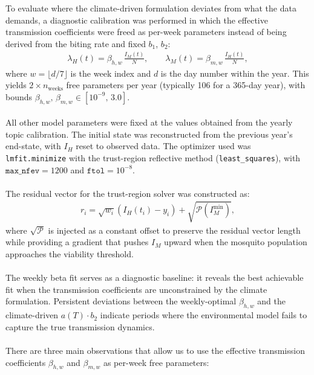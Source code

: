 \documentclass[a4paper,fleqn]{cas-dc}
\begin{document}
To evaluate where the climate-driven formulation deviates from what the data demands, a diagnostic calibration was performed in which the effective transmission coefficients were freed as per-week parameters instead of being derived from the biting rate and fixed $b_1$, $b_2$:
\begin{align}
\lambda_H(t) = \beta_{h,w} \, \frac{I_M(t)}{N}, \qquad \lambda_M(t) = \beta_{m,w} \, \frac{I_H(t)}{N},
\label{eq:weekly_beta}
\end{align}
where $w = \lfloor d / 7 \rfloor$ is the week index and $d$ is the day number within the year. This yields $2 \times n_{\text{weeks}}$ free parameters per year (typically 106 for a 365-day year), with bounds $\beta_{h,w},\, \beta_{m,w} \in [10^{-9},\, 3.0]$.
\\\\
All other model parameters were fixed at the values obtained from the yearly topic calibration. The initial state was reconstructed from the previous year's end-state, with $I_H$ reset to observed data. The optimizer used was \texttt{lmfit.minimize} with the trust-region reflective method (\texttt{least\_squares}), with $\texttt{max\_nfev} = 1200$ and $\texttt{ftol} = 10^{-8}$.
\\\\
The residual vector for the trust-region solver was constructed as:
\begin{align}
r_i = \sqrt{w_i}\left(I_H(t_i) - y_i\right) + \sqrt{\mathcal{P}\!\left(I_M^{\min}\right)},
\label{eq:weekly_residual}
\end{align}
where $\sqrt{\mathcal{P}}$ is injected as a constant offset to preserve the residual vector length while providing a gradient that pushes $I_M$ upward when the mosquito population approaches the viability threshold.
\\\\
The weekly beta fit serves as a diagnostic baseline: it reveals the best achievable fit when the transmission coefficients are unconstrained by the climate formulation. Persistent deviations between the weekly-optimal $\beta_{h,w}$ and the climate-driven $a(T) \cdot b_2$ indicate periods where the environmental model fails to capture the true transmission dynamics.
\\\\
There are three main observations that allow us to use the effective transmission coefficients $\beta_{h,w}$ and $\beta_{m,w}$ as per-week free parameters:
\\\\
\end{document}
